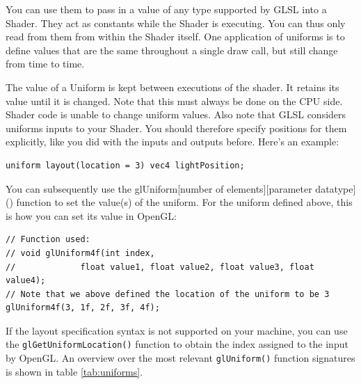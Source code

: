 You can use them to pass in a value of any type supported by GLSL into a Shader. They act as constants while the Shader is executing. You can thus only read from them from within the Shader itself. One application of uniforms is to define values that are the same throughout a single draw call, but still change from time to time. 

The value of a Uniform is kept between executions of the shader. It retains its value until it is changed. Note that this must always be done on the CPU side. Shader code is unable to change uniform values. Also note that GLSL considers uniforms inputs to your Shader. You should therefore specify positions for them explicitly, like you did with the inputs and outputs before. Here's an example: 

\begin{verbatim}
uniform layout(location = 3) vec4 lightPosition;
\end{verbatim}

You can subsequently use the glUniform[number of elements][parameter datatype]() function to set the value(s) of the uniform. For the uniform defined above, this is how you can set its value in OpenGL:

\begin{verbatim}
// Function used: 
// void glUniform4f(int index, 
//             float value1, float value2, float value3, float value4);
// Note that we above defined the location of the uniform to be 3
glUniform4f(3, 1f, 2f, 3f, 4f);
\end{verbatim}

If the layout specification syntax is not supported on your machine, you can use the \texttt{glGetUniformLocation()} function to obtain the index assigned to the input by OpenGL. An overview over the most relevant \texttt{glUniform()} function signatures is shown in table \ref{tab:uniforms}.

